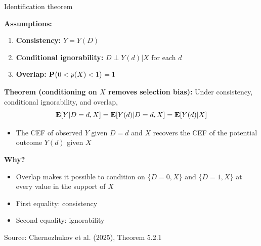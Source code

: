 \documentclass[compress, 8pt]{beamer}
\begin{document}
\begin{frame}{Identification theorem}

\textbf{Assumptions:}
\begin{enumerate}
    \item \textbf{Consistency:} $Y = Y(D)$
    \item \textbf{Conditional ignorability:} $D \perp Y(d) \vert X$ for each $d$
    \item \textbf{Overlap:} $\mathbf{P}\big(0 < p(X) < 1\big) = 1$
\end{enumerate}

\pause
\vspace{2ex}
\textbf{Theorem (conditioning on $X$ removes selection bias):} Under consistency, conditional ignorability, and overlap,
\begin{equation*}
    \mathbf{E} [Y \vert D = d, X] = \mathbf{E} [Y(d) \vert D = d, X] = \mathbf{E} [Y(d) \vert X]
\end{equation*}
\begin{itemize}
    \item The CEF of observed $Y$ given $D = d$ and $X$ recovers the CEF of the potential outcome $Y(d)$ given $X$
\end{itemize}

\pause
\vspace{2ex}
\textbf{Why?}
\begin{itemize}
    \item Overlap makes it possible to condition on $\{D = 0, X\}$ and $\{D = 1, X\}$ at every value in the support of $X$
    \item First equality: consistency
    \item Second equality: ignorability
\end{itemize}

\vspace{2ex}
{\footnotesize Source: Chernozhukov et al. (2025), Theorem 5.2.1}
\end{frame}
\end{document}
